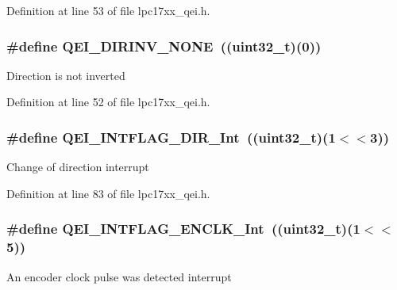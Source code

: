\-Definition at line 53 of file lpc17xx\-\_\-qei.\-h.

\hypertarget{group___q_e_i___public___macros_gacac00295ded16c4578423bcb69a76f89}{
\subsubsection[{\-Q\-E\-I\-\_\-\-D\-I\-R\-I\-N\-V\-\_\-\-N\-O\-N\-E}]{\setlength{\rightskip}{0pt plus 5cm}\#define {\bf \-Q\-E\-I\-\_\-\-D\-I\-R\-I\-N\-V\-\_\-\-N\-O\-N\-E}~((uint32\-\_\-t)(0))}}\label{group___q_e_i___public___macros_gacac00295ded16c4578423bcb69a76f89}
\-Direction is not inverted 

\-Definition at line 52 of file lpc17xx\-\_\-qei.\-h.

\hypertarget{group___q_e_i___public___macros_ga64c637802b84e7d03e0a26913ea91ab0}{
\subsubsection[{\-Q\-E\-I\-\_\-\-I\-N\-T\-F\-L\-A\-G\-\_\-\-D\-I\-R\-\_\-\-Int}]{\setlength{\rightskip}{0pt plus 5cm}\#define {\bf \-Q\-E\-I\-\_\-\-I\-N\-T\-F\-L\-A\-G\-\_\-\-D\-I\-R\-\_\-\-Int}~((uint32\-\_\-t)(1$<$$<$3))}}\label{group___q_e_i___public___macros_ga64c637802b84e7d03e0a26913ea91ab0}
\-Change of direction interrupt 

\-Definition at line 83 of file lpc17xx\-\_\-qei.\-h.

\hypertarget{group___q_e_i___public___macros_ga9138bbe34e72362245c4c137ec1b78f5}{
\subsubsection[{\-Q\-E\-I\-\_\-\-I\-N\-T\-F\-L\-A\-G\-\_\-\-E\-N\-C\-L\-K\-\_\-\-Int}]{\setlength{\rightskip}{0pt plus 5cm}\#define {\bf \-Q\-E\-I\-\_\-\-I\-N\-T\-F\-L\-A\-G\-\_\-\-E\-N\-C\-L\-K\-\_\-\-Int}~((uint32\-\_\-t)(1$<$$<$5))}}\label{group___q_e_i___public___macros_ga9138bbe34e72362245c4c137ec1b78f5}
\-An encoder clock pulse was detected interrupt 

